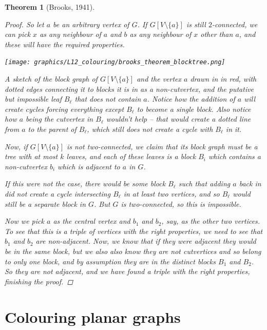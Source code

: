 \documentclass[nobib]{tufte-handout}
\newtheorem{theorem}{Theorem}
\begin{document}
\begin{theorem}[Brooks, 1941]
\begin{proof}
    So let $a$ be an arbitrary vertex of $G$. If $G[V \setminus \{a\}]$ is still $2$-connected, we can pick $x$ as any neighbour of $a$ and $b$ as any neighbour of $x$ other than $a$, and these will have the required properties.

    \begin{marginfigure}
      \centering
      \texttt{[image: graphics/L12\_colouring/brooks\_theorem\_blocktree.png]}
      \caption{A sketch of the block graph of $G[V \setminus \{a\}]$ and the vertex $a$ drawn in in red, with dotted edges connecting it to blocks it is in as a non-cutvertex, and the putative but impossible leaf $B_\ell$ that does not contain $a$. Notice how the addition of $a$ will create cycles forcing everything except $B_\ell$ to become a single block. Also notice how $a$ being the cutvertex in $B_\ell$ wouldn't help -- that would create a dotted line from $a$ to the parent of $B_\ell$, which still does not create a cycle with $B_\ell$ in it.}
    \end{marginfigure}

    Now, if $G[V \setminus \{a\}]$ is not two-connected, we claim that its block graph must be a tree with at most $k$ leaves, and each of these leaves is a block $B_i$ which contains a non-cutvertex $b_i$ which is adjacent to $a$ in $G$. 
    
    If this were not the case, there would be some block $B_\ell$ such that adding $a$ back in did not create a cycle intersecting $B_\ell$ in at least two vertices, and so $B_\ell$ would still be a separate block in $G$. But $G$ is two-connected, so this is impossible.
    
    Now we pick $a$ as the central vertex and $b_1$ and $b_2$, say, as the other two vertices. To see that this is a triple of vertices with the right properties, we need to see that $b_1$ and $b_2$ are non-adjacent. Now, we know that if they were adjacent they would be in the same block, but we also also know they are not cutvertices and so belong to only one block, and by assumption they are in the distinct blocks $B_1$ and $B_2$. So they are not adjacent, and we have found a triple with the right properties, finishing the proof.
  \end{proof}
\end{theorem}

\section{Colouring planar graphs}
\end{document}
